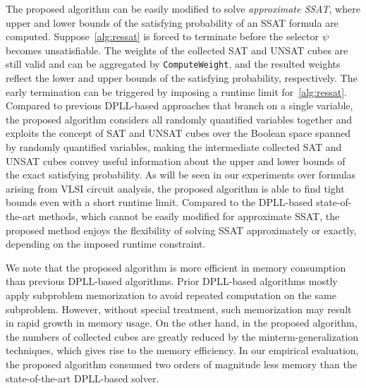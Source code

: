 The proposed algorithm can be easily modified to solve \textit{approximate SSAT},
where upper and lower bounds of the satisfying probability of an SSAT formula are computed.
Suppose~\cref{alg:ressat} is forced to terminate before the selector $\psi$ becomes unsatisfiable.
The weights of the collected SAT and UNSAT cubes are still valid and can be aggregated by \texttt{ComputeWeight},
and the resulted weights reflect the lower and upper bounds of the satisfying probability, respectively.
The early termination can be triggered by imposing a runtime limit for~\cref{alg:ressat}.
Compared to previous DPLL-based approaches that branch on a single variable,
the proposed algorithm considers all randomly quantified variables together and exploits the concept of SAT and UNSAT cubes over the Boolean space spanned by randomly quantified variables,
making the intermediate collected SAT and UNSAT cubes convey useful information about the upper and lower bounds of the exact satisfying probability.
As will be seen in our experiments over formulas arising from VLSI circuit analysis,
the proposed algorithm is able to find tight bounds even with a short runtime limit.
Compared to the DPLL-based state-of-the-art methods,
which cannot be easily modified for approximate SSAT,
the proposed method enjoys the flexibility of solving SSAT approximately or exactly,
depending on the imposed runtime constraint.

We note that the proposed algorithm is more efficient in memory consumption than previous DPLL-based algorithms.
Prior DPLL-based algorithms mostly apply subproblem memorization to avoid repeated computation on the same subproblem.
However, without special treatment, such memorization may result in rapid growth in memory usage.
On the other hand, in the proposed algorithm,
the numbers of collected cubes are greatly reduced by the minterm-generalization techniques,
which gives rise to the memory efficiency.
In our empirical evaluation,
the proposed algorithm consumed two orders of magnitude less memory than the state-of-the-art DPLL-based solver.

